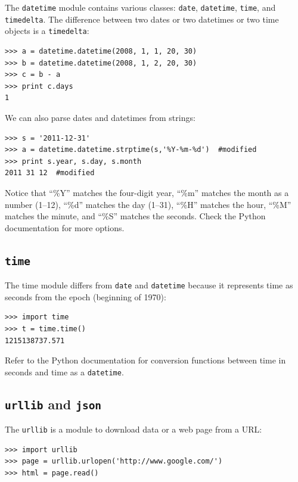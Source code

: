 \documentclass[justified,sixbynine]{tufte-book}
\def\ft{\small\tt}
\theoremstyle{plain}%
\theoremstyle{definition}
\theoremstyle{remark}
\begin{document}
\begin{fullwidth}
The {\ft datetime} module contains various classes: {\ft date}, {\ft datetime}, {\ft time}, and {\ft timedelta}. The difference between two dates or two datetimes or two time objects is a {\ft timedelta}:
\begin{lstlisting}
>>> a = datetime.datetime(2008, 1, 1, 20, 30)
>>> b = datetime.datetime(2008, 1, 2, 20, 30)
>>> c = b - a
>>> print c.days
1
\end{lstlisting}

We can also parse dates and datetimes from strings:
\begin{lstlisting}
>>> s = '2011-12-31'
>>> a = datetime.datetime.strptime(s,'%Y-%m-%d')  #modified
>>> print s.year, s.day, s.month
2011 31 12  #modified
\end{lstlisting}

Notice that ``\%Y'' matches the four-digit year, ``\%m'' matches the month as a number (1--12), ``\%d'' matches the day (1--31), ``\%H'' matches the hour, ``\%M'' matches the minute, and ``\%S'' matches the seconds. Check the Python documentation for more options.

\goodbreak\subsection{{\ft time}}


The time module differs from {\ft date} and {\ft datetime} because it represents time as seconds from the epoch (beginning of 1970):
\begin{lstlisting}
>>> import time
>>> t = time.time()
1215138737.571
\end{lstlisting}

Refer to the Python documentation for conversion functions between time in seconds and time as a {\ft datetime}.

\goodbreak\subsection{{\ft urllib} and {\ft json}}


The {\ft urllib} is a module to download data or a web page from a URL:

\begin{lstlisting}
>>> import urllib
>>> page = urllib.urlopen('http://www.google.com/')
>>> html = page.read()
\end{lstlisting}


\end{fullwidth}
\end{document}

